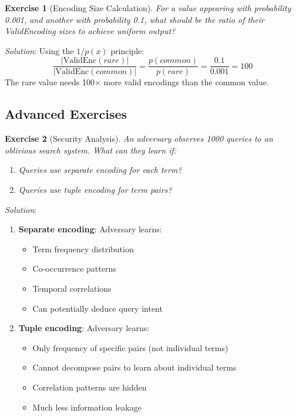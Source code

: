 \documentclass[11pt]{article}
\newtheorem{exercise}{Exercise}[section]
\newcommand{\ValidEnc}[1]{\text{ValidEnc}(#1)}
\begin{document}
\begin{exercise}[Encoding Size Calculation]
For a value appearing with probability 0.001, and another with probability 0.1, what should be the ratio of their ValidEncoding sizes to achieve uniform output?
\end{exercise}

\textit{Solution}: Using the $1/p(x)$ principle:
\[\frac{|\ValidEnc{rare}|}{|\ValidEnc{common}|} = \frac{p(common)}{p(rare)} = \frac{0.1}{0.001} = 100\]
The rare value needs 100× more valid encodings than the common value.

\subsection{Advanced Exercises}

\begin{exercise}[Security Analysis]
An adversary observes 1000 queries to an oblivious search system. What can they learn if:
\begin{enumerate}
    \item Queries use separate encoding for each term?
    \item Queries use tuple encoding for term pairs?
\end{enumerate}
\end{exercise}

\textit{Solution}:
\begin{enumerate}
    \item \textbf{Separate encoding}: Adversary learns:
        \begin{itemize}
            \item Term frequency distribution
            \item Co-occurrence patterns
            \item Temporal correlations
            \item Can potentially deduce query intent
        \end{itemize}
    \item \textbf{Tuple encoding}: Adversary learns:
        \begin{itemize}
            \item Only frequency of specific pairs (not individual terms)
            \item Cannot decompose pairs to learn about individual terms
            \item Correlation patterns are hidden
            \item Much less information leakage
        \end{itemize}
\end{enumerate}
\end{document}
